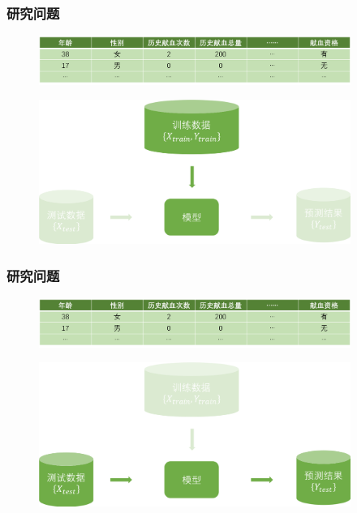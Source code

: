 \documentclass[10pt,aspectratio=43,mathserif]{beamer}
\begin{document}
    \begin{frame}
        \frametitle{\textbf{研究问题}}
        \begin{figure}[!t]
            \centering 
            \includegraphics[width=4in]{figures/samples.png}
        \end{figure}
        
        \begin{figure}[!t]
            \centering 
            \includegraphics[width=4in]{figures/training1.png}
        \end{figure}

    \end{frame}

    \begin{frame}
        \frametitle{\textbf{研究问题}}
        \begin{figure}[!t]
            \centering 
            \includegraphics[width=4in]{figures/samples.png}
        \end{figure}
        
        \begin{figure}[!t]
            \centering 
            \includegraphics[width=4in]{figures/testing1.png}
        \end{figure}

    \end{frame}
\end{document}
